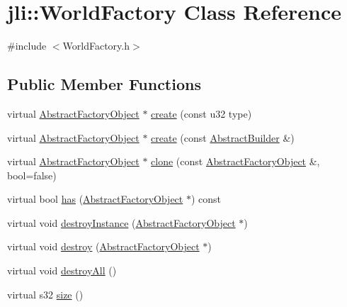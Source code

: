 \hypertarget{classjli_1_1_world_factory}{\section{jli\+:\+:World\+Factory Class Reference}
\label{classjli_1_1_world_factory}
}


{\ttfamily \#include $<$World\+Factory.\+h$>$}

\subsection*{Public Member Functions}
\begin{DoxyCompactItemize}
\item 
virtual \hyperlink{namespacejli_aee55f3bcfb22fdfec10eadeec1618fec}{Abstract\+Factory\+Object} $\ast$ \hyperlink{classjli_1_1_world_factory_ae84dad80ebffaf34cdc7fe95d1e7a66e}{create} (const u32 type)
\item 
virtual \hyperlink{namespacejli_aee55f3bcfb22fdfec10eadeec1618fec}{Abstract\+Factory\+Object} $\ast$ \hyperlink{classjli_1_1_world_factory_a7907b82e19f4bbb1f5c98fbceaf7d961}{create} (const \hyperlink{classjli_1_1_abstract_builder}{Abstract\+Builder} \&)
\item 
virtual \hyperlink{namespacejli_aee55f3bcfb22fdfec10eadeec1618fec}{Abstract\+Factory\+Object} $\ast$ \hyperlink{classjli_1_1_world_factory_aadc177f52ddc2a0d53259ea99fbf90df}{clone} (const \hyperlink{namespacejli_aee55f3bcfb22fdfec10eadeec1618fec}{Abstract\+Factory\+Object} \&, bool=false)
\item 
virtual bool \hyperlink{classjli_1_1_world_factory_a29af5f1c2a8f5e57c0dc4e9764715797}{has} (\hyperlink{namespacejli_aee55f3bcfb22fdfec10eadeec1618fec}{Abstract\+Factory\+Object} $\ast$) const 
\item 
virtual void \hyperlink{classjli_1_1_world_factory_a715756195f93bfec6f6c54640e5e09e5}{destroy\+Instance} (\hyperlink{namespacejli_aee55f3bcfb22fdfec10eadeec1618fec}{Abstract\+Factory\+Object} $\ast$)
\item 
virtual void \hyperlink{classjli_1_1_world_factory_ac40ef526c98ded68e2be556995147ca5}{destroy} (\hyperlink{namespacejli_aee55f3bcfb22fdfec10eadeec1618fec}{Abstract\+Factory\+Object} $\ast$)
\item 
virtual void \hyperlink{classjli_1_1_world_factory_a17880329ad38799467c11830c8b2b39e}{destroy\+All} ()
\item 
virtual s32 \hyperlink{classjli_1_1_world_factory_a56279adb8ce6f7072739a5b7eeccd45b}{size} ()

\end{DoxyCompactItemize}
